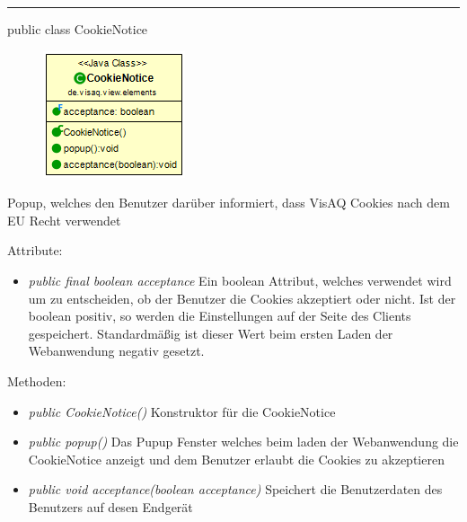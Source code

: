 
\rule{\textwidth}{0.4pt}
public class CookieNotice

\begin{minipage}{0.3\textwidth}
    \begin{figure}[H]
        \includegraphics[scale = 0.6]{media/frontend/view/de.view.elements/CookieNotice_Class.png}
    \end{figure}
    \end{minipage} \hfill
    \begin{minipage}{0.6\textwidth}
Popup, welches den Benutzer darüber informiert, dass VisAQ Cookies nach dem EU Recht verwendet
\end{minipage}

Attribute:
\begin{itemize}
    \item \emph{public final boolean acceptance} Ein boolean Attribut, welches verwendet wird um zu entscheiden, ob der Benutzer die Cookies akzeptiert oder nicht. Ist der boolean positiv, so werden die Einstellungen auf der Seite des Clients gespeichert. Standardmäßig ist dieser Wert beim ersten Laden der Webanwendung negativ gesetzt.
\end{itemize}
Methoden:
\begin{itemize}
    \item \emph{public CookieNotice()} Konstruktor für die CookieNotice
    \item \emph{public popup()} Das Pupup Fenster welches beim laden der Webanwendung die CookieNotice anzeigt und dem Benutzer erlaubt die Cookies zu akzeptieren
    \item \emph{public void acceptance(boolean acceptance)} Speichert die Benutzerdaten des Benutzers auf desen Endgerät
\end{itemize}
